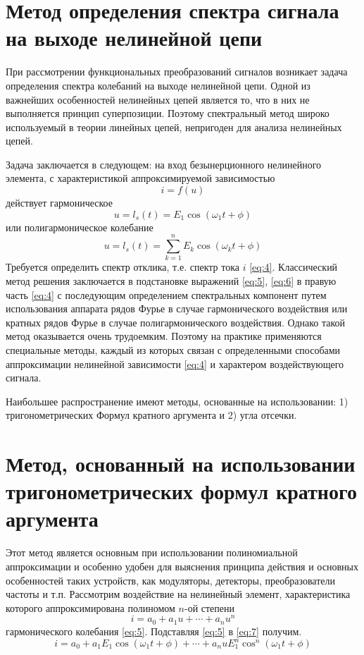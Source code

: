 \section{Метод определения спектра сигнала на выходе нелинейной цепи}
При рассмотрении функциональных преобразований сигналов возникает задача определения спектра колебаний на выходе нелинейной цепи. Одной из важнейших особенностей нелинейных цепей является то, что в них не выполняется принцип суперпозиции. Поэтому спектральный метод широко используемый в теории линейных цепей, непригоден для анализа нелинейных цепей.

Задача заключается в следующем: на вход безынерционного нелинейного элемента, с характеристикой аппроксимируемой зависимостью
\begin{equation}
i=f(u)
\label{eq:4}
\end{equation}
действует гармоническое
\begin{equation}
u=l_s(t)=E_1\cos(\omega_1t+\phi)
\label{eq:5}
\end{equation}
или полигармоническое колебание
\begin{equation}
u=l_s(t)=\sum_{k=1}^{n}E_k\cos(\omega_kt+\phi)
\label{eq:6}
\end{equation}
Требуется определить спектр отклика, т.е. спектр тока $i$ \eqref{eq:4}.
Классический метод решения заключается в подстановке выражений \eqref{eq:5}, \eqref{eq:6} в правую часть \eqref{eq:4} с последующим определением спектральных компонент путем использования аппарата рядов Фурье в случае гармонического воздействия или кратных рядов Фурье в случае полигармонического воздействия. Однако такой метод оказывается очень трудоемким. Поэтому на практике применяются специальные методы, каждый из которых связан с определенными способами аппроксимации нелинейной зависимости \eqref{eq:4} и характером воздействующего сигнала.

Наибольшее распространение имеют методы, основанные на использовании: 1) тригонометрических Формул кратного аргумента и 2) угла отсечки.
\section{Метод, основанный на использовании тригонометрических формул кратного аргумента}
Этот метод является основным при использовании полиномиальной аппроксимации и особенно удобен для выяснения принципа действия и основных особенностей таких устройств, как модуляторы, детекторы, преобразователи частоты и т.п. Рассмотрим воздействие на нелинейный элемент, характеристика которого аппроксимирована полиномом $n$-ой степени
\begin{equation}
i=a_0+a_1u+\cdots+a_nu^n
\label{eq:7}
\end{equation}
гармонического колебания \eqref{eq:5}. Подставляя \eqref{eq:5} в \eqref{eq:7} получим. 
\begin{equation}
i=a_0+a_1E_1\cos(\omega_1t+\phi)+\cdots+a_nuE_1^n\cos^n(\omega_1t+\phi)
\label{eq:8}
\end{equation}

